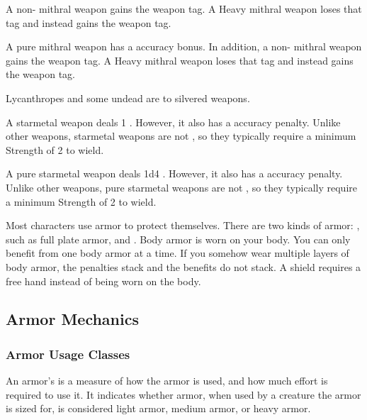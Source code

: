        A non- mithral weapon gains the  weapon tag.
      A Heavy mithral weapon loses that tag and instead gains the  weapon tag.

       A pure mithral weapon has a  accuracy bonus.
      In addition, a non- mithral weapon gains the  weapon tag.
      A Heavy mithral weapon loses that tag and instead gains the  weapon tag.

       Lycanthropes and some undead are \vulnerable to silvered weapons.

       A starmetal weapon deals 1 .
      However, it also has a  accuracy penalty.
      Unlike other weapons, starmetal weapons are not , so they typically require a minimum Strength of 2 to wield.

       A pure starmetal weapon deals 1d4 .
      However, it also has a  accuracy penalty.
      Unlike other weapons, pure starmetal weapons are not , so they typically require a minimum Strength of 2 to wield.

\newpage
{}

  Most characters use armor to protect themselves. There are two kinds of armor: , such as full plate armor, and .
  Body armor is worn on your body.
  You can only benefit from one body armor at a time.
  If you somehow wear multiple layers of body armor, the penalties stack and the benefits do not stack.
  A shield requires a free hand instead of being worn on the body.

  \subsection{Armor Mechanics}

    \subsubsection{Armor Usage Classes}\label{Armor Usage Classes}
      An armor's  is a measure of how the armor is used, and how much effort is required to use it.
      It indicates whether armor, when used by a creature the armor is sized for, is considered light armor, medium armor, or heavy armor.

